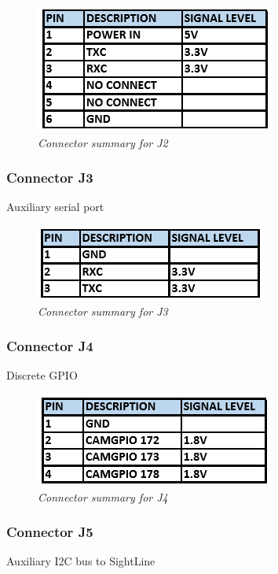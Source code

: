 \documentclass[11pt]{article}
\begin{document}
    \begin{figure}[H]
	\centering	
	\includegraphics[width=3 in]{CONN_J2}
	\caption{\textit{Connector summary for J2}}	
	\end{figure}

\subsubsection{Connector J3}
Auxiliary serial port

    \begin{figure}[H]
	\centering	
	\includegraphics[width=3 in]{CONN_J3}
	\caption{\textit{Connector summary for J3}}	
	\end{figure}

\subsubsection{Connector J4}
Discrete GPIO

    \begin{figure}[H]
	\centering	
	\includegraphics[width=3 in]{CONN_J4}
	\caption{\textit{Connector summary for J4}}	
	\end{figure}

\newpage

\subsubsection{Connector J5}
Auxiliary I2C bus to SightLine
\end{document}
